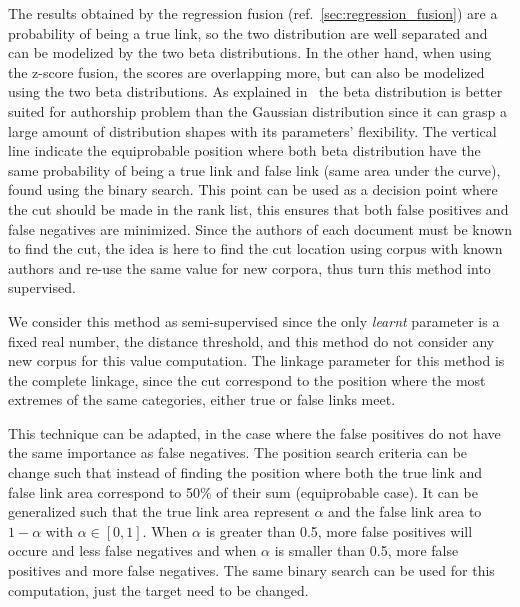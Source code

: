 The results obtained by the regression fusion (ref.~\ref{sec:regression_fusion}) are a probability of being a true link, so the two distribution are well separated and can be modelized by the two beta distributions.
In the other hand, when using the z-score fusion, the scores are overlapping more, but can also be modelized using the two beta distributions.
As explained in~\cite{savoy_probability} the beta distribution is better suited for authorship problem than the Gaussian distribution since it can grasp a large amount of distribution shapes with its parameters' flexibility.
The vertical line indicate the equiprobable position where both beta distribution have the same probability of being a true link and false link (same area under the curve), found using the binary search.
This point can be used as a decision point where the cut should be made in the rank list, this ensures that both false positives and false negatives are minimized.
Since the authors of each document must be known to find the cut, the idea is here to find the cut location using corpus with known authors and re-use the same value for new corpora, thus turn this method into supervised.

We consider this method as semi-supervised since the only \textit{learnt} parameter is a fixed real number, the distance threshold, and this method do not consider any new corpus for this value computation.
The linkage parameter for this method is the complete linkage, since the cut correspond to the position where the most extremes of the same categories, either true or false links meet.

This technique can be adapted, in the case where the false positives do not have the same importance as false negatives.
The position search criteria can be change such that instead of finding the position where both the true link and false link area correspond to 50\% of their sum (equiprobable case).
It can be generalized such that the true link area represent $\alpha$ and the false link area to $1-\alpha$ with $\alpha \in \left[0,1\right]$.
When $\alpha$ is greater than 0.5, more false positives will occure and less false negatives and when $\alpha$ is smaller than 0.5, more false positives and more false negatives.
The same binary search can be used for this computation, just the target need to be changed.

